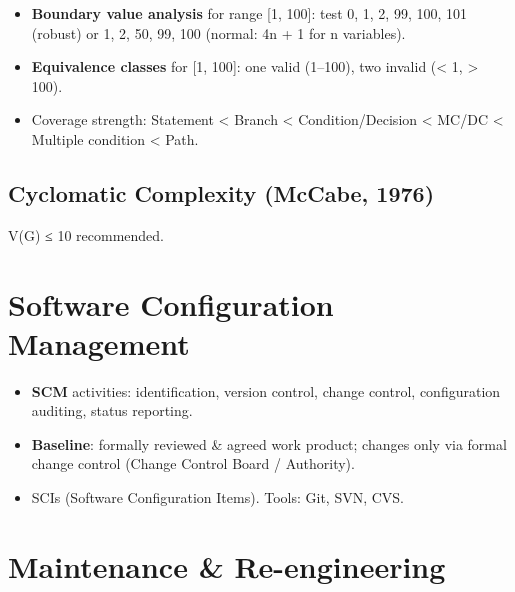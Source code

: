 \endgroup

\begin{itemize}
\tightlist
\item
  \textbf{Boundary value analysis} for range {[}1, 100{]}: test 0, 1, 2, 99, 100, 101 (robust) or 1, 2, 50, 99, 100 (normal: 4n + 1 for n variables).
\item
  \textbf{Equivalence classes} for {[}1, 100{]}: one valid (1--100), two invalid (\textless{} 1, \textgreater{} 100).
\item
  Coverage strength: Statement \textless{} Branch \textless{} Condition/Decision \textless{} MC/DC \textless{} Multiple condition \textless{} Path.
\end{itemize}

\needspace{95pt}

\hypertarget{p2-06--64-cyclomatic-complexity-mccabe-1976}{%
\subsection{Cyclomatic Complexity (McCabe, 1976)}\label{p2-06--64-cyclomatic-complexity-mccabe-1976}}





V(G) ≤ 10 recommended.

\needspace{95pt}

\hypertarget{p2-06--7-software-configuration-management}{%
\section{Software Configuration Management}\label{p2-06--7-software-configuration-management}}

\begin{itemize}
\tightlist
\item
  \textbf{SCM} activities: identification, version control, change control, configuration auditing, status reporting.
\item
  \textbf{Baseline}: formally reviewed \& agreed work product; changes only via formal change control (Change Control Board / Authority).
\item
  SCIs (Software Configuration Items). Tools: Git, SVN, CVS.
\end{itemize}

\needspace{160pt}

\hypertarget{p2-06--8-maintenance--re-engineering}{%
\section{Maintenance \& Re-engineering}\label{p2-06--8-maintenance--re-engineering}}

